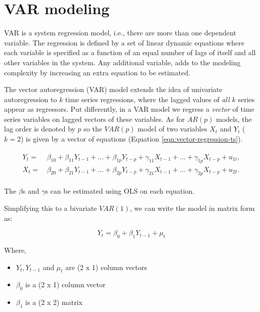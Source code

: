 \documentclass[
  12pt,
]{article}
\providecommand{\tightlist}{%
  \setlength{\itemsep}{0pt}\setlength{\parskip}{0pt}}
\begin{document}
\hypertarget{var-modeling}{%
\section{VAR modeling}\label{var-modeling}}

VAR is a system regression model, i.e., there are more than one dependent variable. The regression is defined by a set of linear dynamic equations where each variable is specified as a function of an equal number of lags of itself and all other variables in the system. Any additional variable, adds to the modeling complexity by increasing an extra equation to be estimated.

The vector autoregression (VAR) model extends the idea of univariate autoregression to \(k\) time series regressions, where the lagged values of \emph{all} \(k\) series appear as regressors. Put differently, in a VAR model we regress a \emph{vector} of time series variables on lagged vectors of these variables. As for \(AR(p)\) models, the lag order is denoted by \(p\) so the \(VAR(p)\) model of two variables \(X_t\) and \(Y_t\) (\(k=2\)) is given by a vector of equations (Equation \ref{eqn:vector-regression-ts}).

\begin{equation}
\label{eqn:vector-regression-ts}
\begin{split}
\begin{aligned}
  Y_t =& \, \beta_{10} + \beta_{11} Y_{t-1} + \dots + \beta_{1p} Y_{t-p} + \gamma_{11} X_{t-1} + \dots + \gamma_{1p} X_{t-p} + u_{1t}, \\
  X_t =& \, \beta_{20} + \beta_{21} Y_{t-1} + \dots + \beta_{2p} Y_{t-p} + \gamma_{21} X_{t-1} + \dots + \gamma_{2p} X_{t-p} + u_{2t}.
\end{aligned}
\end{split}
\end{equation}

The \(\beta\)s and \(\gamma\)s can be estimated using OLS on each equation.

Simplifying this to a bivariate \(VAR(1)\), we can write the model in matrix form as:

\begin{equation}
\label{eqn:matix-var1-model}
Y_t = \beta_0 + \beta_1 Y_{t-1} + \mu_t
\end{equation}

Where,

\begin{itemize}
\tightlist
\item
  \(Y_t, Y_{t-1}\) and \(\mu_t\) are (2 x 1) column vectors
\item
  \(\beta_0\) is a (2 x 1) column vector
\item
  \(\beta_1\) is a (2 x 2) matrix
\end{itemize}
\end{document}
